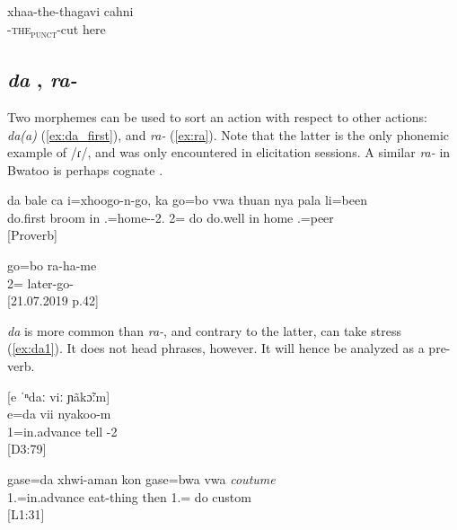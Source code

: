 \ea \label{ex:xhaa}
\gll xhaa-the-thagavi cahni\\
 -\textsc{the\textsubscript{punct}}-cut here\\
\glt {}
\z

\subsection{\textit{da} , \textit{ra-} }
Two morphemes can be used to sort an action with respect to other actions: \textit{da(a)}  (\ref{ex:da_first}), and \textit{ra-}  (\ref{ex:ra}). Note that the latter is the only phonemic example of /ɾ/, and was only encountered in elicitation sessions. A similar \textit{ra-}  in Bwatoo is perhaps cognate \parencite[56]{rivierre_bwatoo_2006}.


\ea\label{ex:da_first}\gll da bale ca i=xhoogo-n-go, ka go=bo vwa thuan nya pala li=been\\
 do.first broom in .=home--2.  2= do do.well in home .=peer\\
\glt {} {[Proverb]}
\z 


\ea\label{ex:ra}\gll go=bo ra-ha-me\\
 2= later-go-\\
\glt {} {[21.07.2019 p.42]}
\z

\textit{da}  is more common than \textit{ra-}, and contrary to the latter, can take stress (\ref{ex:da1}). It does not head phrases, however. It will hence be analyzed as a pre-verb.


\ea\label{ex:da1}
[e ˈⁿdaː viː ɲãkɔ̃ːm]\\
\gll e=da vii nyakoo-m\\
 1=in.advance tell -2\\
\glt {} {[D3:79]}
\z


\ea
\gll  gase=da xhwi-aman kon gase=bwa vwa \textit{coutume}\\
 1.=in.advance eat-thing then 1.= do custom\\
\glt {} {[L1:31]}
\z

